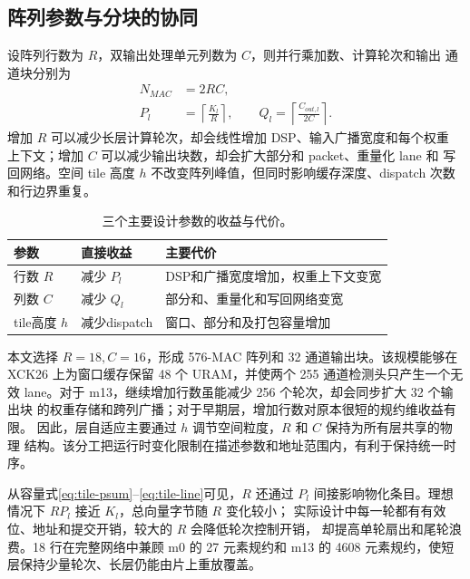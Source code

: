 \subsection{阵列参数与分块的协同}

设阵列行数为 $R$，双输出处理单元列数为 $C$，则并行乘加数、计算轮次和输出
通道块分别为
\begin{equation}
\begin{aligned}
N_{MAC}&=2RC,\\
P_l&=\left\lceil\frac{K_l}{R}\right\rceil,\qquad
Q_l=\left\lceil\frac{C_{out,l}}{2C}\right\rceil .
\end{aligned}
\label{eq:array-space}
\end{equation}
增加 $R$ 可以减少长层计算轮次，却会线性增加 DSP、输入广播宽度和每个权重
上下文；增加 $C$ 可以减少输出块数，却会扩大部分和 packet、重量化 lane 和
写回网络。空间 tile 高度 $h$ 不改变阵列峰值，但同时影响缓存深度、dispatch
次数和行边界重复。

\begin{table}[t]
\centering
\caption{三个主要设计参数的收益与代价。}
\label{tab:design-space}
\small
\setlength{\tabcolsep}{3pt}
\begin{tabular}{lp{25mm}p{34mm}}
\toprule
参数 & 直接收益 & 主要代价 \\
\midrule
行数 $R$ & 减少 $P_l$ & DSP和广播宽度增加，权重上下文变宽 \\
列数 $C$ & 减少 $Q_l$ & 部分和、重量化和写回网络变宽 \\
tile高度 $h$ & 减少dispatch & 窗口、部分和及打包容量增加 \\
\bottomrule
\end{tabular}
\end{table}

本文选择 $R=18,C=16$，形成 576-MAC 阵列和 32 通道输出块。该规模能够在
XCK26 上为窗口缓存保留 48 个 URAM，并使两个 255 通道检测头只产生一个无效
lane。对于 m13，继续增加行数虽能减少 256 个轮次，却会同步扩大 32 个输出块
的权重存储和跨列广播；对于早期层，增加行数对原本很短的规约维收益有限。
因此，层自适应主要通过 $h$ 调节空间粒度，$R$ 和 $C$ 保持为所有层共享的物理
结构。该分工把运行时变化限制在描述参数和地址范围内，有利于保持统一时序。

从容量式\eqref{eq:tile-psum}--\eqref{eq:tile-line}可见，$R$ 还通过 $P_l$
间接影响物化条目。理想情况下 $RP_l$ 接近 $K_l$，总向量字节随 $R$ 变化较小；
实际设计中每一轮都有有效位、地址和提交开销，较大的 $R$ 会降低轮次控制开销，
却提高单轮扇出和尾轮浪费。18 行在完整网络中兼顾 m0 的 27 元素规约和 m13 的
4608 元素规约，使短层保持少量轮次、长层仍能由片上重放覆盖。

